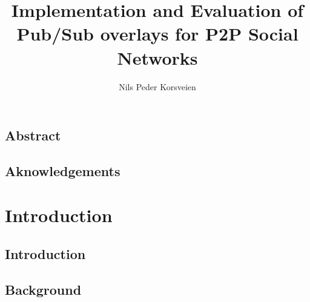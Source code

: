 \documentclass[UKenglish, a4paper]{ifimaster}
\title{Implementation and Evaluation of Pub/Sub overlays for P2P Social Networks}
\subtitle{}
\author{Nils Peder Korsveien}
\begin{document}
\ififorside{}
\frontmatter{}
\maketitle{}

\chapter*{Abstract}
\tableofcontents{}
\listoffigures{}
\listoftables{}
\chapter*{Aknowledgements}
\mainmatter{}

\part{Introduction}

    \chapter{Introduction}
    

    \chapter{Background}
    
\end{document}
